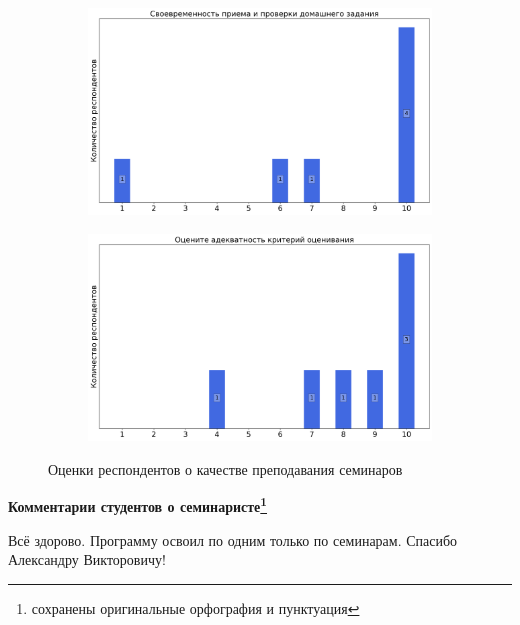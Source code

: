 \begin{figure}[H]
\begin{subfigure}[b]{0.45\textwidth}
                \includegraphics[width=\textwidth]{images/1 course/Дискретный анализ/seminarists-marks-Савельев А.В.-2.png}
            \end{subfigure}
            \begin{subfigure}[b]{0.45\textwidth}
                \centering
                \includegraphics[width=\textwidth]{images/1 course/Дискретный анализ/seminarists-marks-Савельев А.В.-3.png}
            \end{subfigure}	
            \caption{Оценки респондентов о качестве преподавания семинаров}
        \end{figure}

        \textbf{Комментарии студентов о семинаристе\protect\footnote{сохранены оригинальные орфография и пунктуация}}
            \begin{commentbox} 
                Всё здорово. Программу освоил по одним только по семинарам. Спасибо Александру Викторовичу! 
            \end{commentbox} 
        
